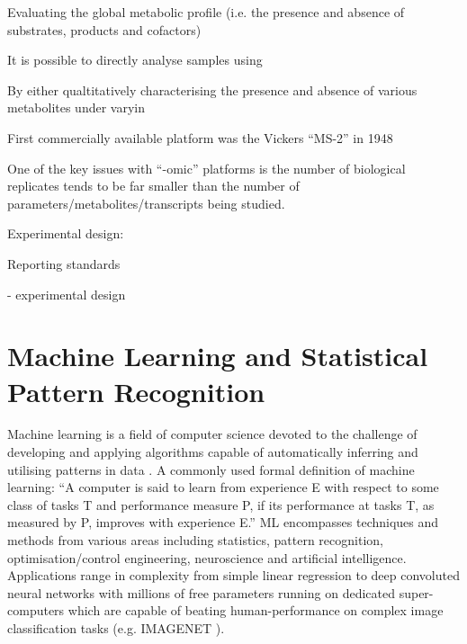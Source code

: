 Evaluating the global metabolic profile (i.e. the presence and absence of 
substrates, products and cofactors) 



It is possible to directly analyse samples using 





By either qualtitatively characterising the presence and absence of various
metabolites under varyin





First commercially available platform was the Vickers ``MS-2'' in 1948





One of the key issues with ``-omic'' platforms is the number of biological replicates 
tends to be far smaller than the number of parameters/metabolites/transcripts being
studied. 


Experimental design: 




Reporting standards \citep{Goodacre2007}

- experimental design



\section{Machine Learning and Statistical Pattern Recognition}

Machine learning is a field of computer science 
devoted to the challenge of developing and applying algorithms capable of 
automatically inferring and utilising patterns in data \citep{Murphy2012}.
A commonly used formal definition of machine learning:
``A computer is said to learn from experience E with respect to some class of tasks 
T and performance measure P, if its performance at tasks T, as measured by P, improves 
with experience E.'' \citep{Mitchell1997}
ML encompasses techniques and methods from various areas including statistics,
pattern recognition, optimisation/control engineering, neuroscience and artificial intelligence.
Applications range in complexity from simple linear regression to deep convoluted neural networks 
with millions of free parameters running on dedicated super-computers \citep{Wu2014} 
which are capable of beating human-performance on complex image classification tasks 
(e.g. IMAGENET \citep{Berg2014,He2015}).

